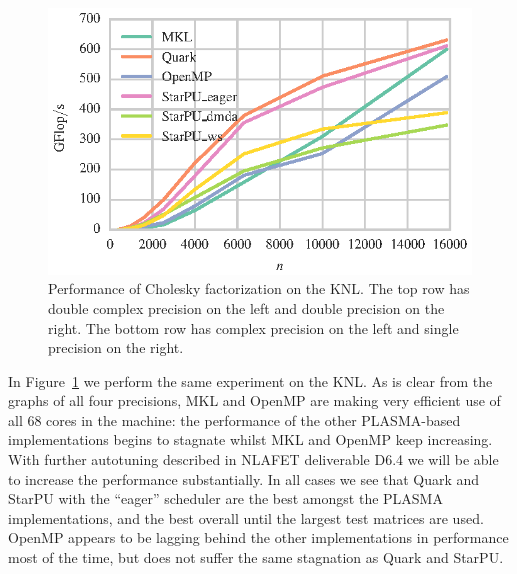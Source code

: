 \documentclass[a4paper,12pt]{article}
\begin{document}
\begin{figure}[t]
  \includegraphics[scale=.85]{fig/knl_ram_spotrf_weak_scaling.eps}
  \caption{Performance of Cholesky factorization on the KNL.
    The top row has double complex precision on the left and double
    precision on the right.
    The bottom row has complex precision on the left and single
    precision on the right.}
  \label{fig.chol_knl_ram}
\end{figure}

In Figure~\ref{fig.chol_knl_ram} we perform the same experiment
on the KNL.
As is clear from the graphs of all four precisions,
MKL and OpenMP are making very efficient use of all $68$ cores in the machine:
the performance of the other PLASMA-based implementations
begins to stagnate whilst MKL and OpenMP keep increasing.
With further autotuning described in NLAFET deliverable D6.4
we will be able to increase the performance substantially.
In all cases we see that Quark and StarPU with the ``eager''
scheduler are the best amongst the PLASMA implementations,
and the best overall until the largest test matrices are used.
OpenMP appears to be lagging behind the other implementations
in performance most of the time,
but does not suffer the same stagnation as Quark and StarPU.

\end{document}
